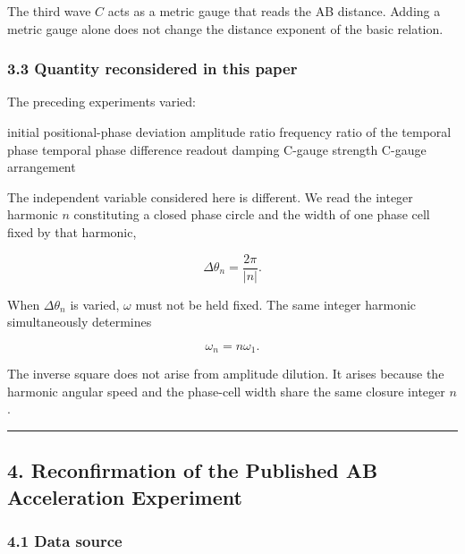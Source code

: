 \documentclass[
  a4paper,
]{article}
\newenvironment{Shaded}{}{}
\newcommand{\NormalTok}[1]{#1}
\begin{document}
The third wave \(C\) acts as a metric gauge that reads the AB distance.
Adding a metric gauge alone does not change the distance exponent of the
basic relation.

\subsubsection{3.3 Quantity reconsidered in this
paper}\label{quantity-reconsidered-in-this-paper}

The preceding experiments varied:

\begin{Shaded}
\begin{Highlighting}[]
\NormalTok{initial positional{-}phase deviation}
\NormalTok{amplitude ratio}
\NormalTok{frequency ratio of the temporal phase}
\NormalTok{temporal phase difference}
\NormalTok{readout damping}
\NormalTok{C{-}gauge strength}
\NormalTok{C{-}gauge arrangement}
\end{Highlighting}
\end{Shaded}

The independent variable considered here is different. We read the
integer harmonic \(n\) constituting a closed phase circle and the width
of one phase cell fixed by that harmonic,

\[
\Delta\theta_n=\frac{2\pi}{|n|}.
\]

When \(\Delta\theta_n\) is varied, \(\omega\) must not be held fixed.
The same integer harmonic simultaneously determines

\[
\omega_n=n\omega_1.
\]

The inverse square does not arise from amplitude dilution. It arises
because the harmonic angular speed and the phase-cell width share the
same closure integer \(n\).

\begin{center}\rule{0.5\linewidth}{0.5pt}\end{center}

\subsection{4. Reconfirmation of the Published AB Acceleration
Experiment}\label{reconfirmation-of-the-published-ab-acceleration-experiment}

\subsubsection{4.1 Data source}\label{data-source}
\end{document}
